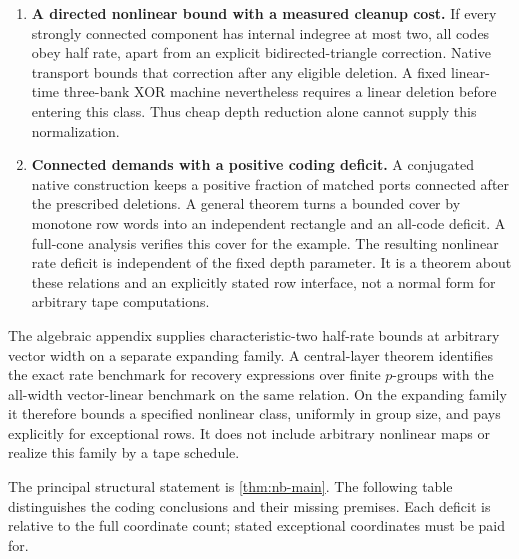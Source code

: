 \begin{enumerate}[label=\textup{(\arabic*)}]
\item \textbf{A directed nonlinear bound with a measured cleanup cost.} If every strongly connected component has internal indegree at most two, all codes obey half rate, apart from an explicit bidirected-triangle correction. Native transport bounds that correction after any eligible deletion. A fixed linear-time three-bank XOR machine nevertheless requires a linear deletion before entering this class. Thus cheap depth reduction alone cannot supply this normalization.

\item \textbf{Connected demands with a positive coding deficit.} A conjugated native construction keeps a positive fraction of matched ports connected after the prescribed deletions. A general theorem turns a bounded cover by monotone row words into an independent rectangle and an all-code deficit. A full-cone analysis verifies this cover for the example. The resulting nonlinear rate deficit is independent of the fixed depth parameter. It is a theorem about these relations and an explicitly stated row interface, not a normal form for arbitrary tape computations.
\end{enumerate}

The algebraic appendix supplies characteristic-two half-rate bounds at arbitrary vector width on a separate expanding family. A central-layer theorem identifies the exact rate benchmark for recovery expressions over finite $p$-groups with the all-width vector-linear benchmark on the same relation. On the expanding family it therefore bounds a specified nonlinear class, uniformly in group size, and pays explicitly for exceptional rows. It does not include arbitrary nonlinear maps or realize this family by a tape schedule.

The principal structural statement is \cref{thm:nb-main}. The following table distinguishes the coding conclusions and their missing premises. Each deficit is relative to the full coordinate count; stated exceptional coordinates must be paid for.


